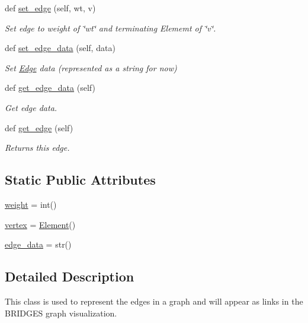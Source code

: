 \begin{DoxyCompactItemize}
def \mbox{\hyperlink{class_bridges_1_1_edge_1_1_edge_aba4ff033130d2e7efcc85360631458e8}{set\+\_\+edge}} (self, wt, v)
\begin{DoxyCompactList}\small\item\em Set edge to weight of \char`\"{}wt\char`\"{} and terminating Elememt of \char`\"{}v\char`\"{}. \end{DoxyCompactList}\item 
def \mbox{\hyperlink{class_bridges_1_1_edge_1_1_edge_a2ff2270572ae079d1db9e03c54c27056}{set\+\_\+edge\+\_\+data}} (self, data)
\begin{DoxyCompactList}\small\item\em Set \mbox{\hyperlink{class_bridges_1_1_edge_1_1_edge}{Edge}} data (represented as a string for now) \end{DoxyCompactList}\item 
def \mbox{\hyperlink{class_bridges_1_1_edge_1_1_edge_a5820f67d43e270bae8295683cf1d548f}{get\+\_\+edge\+\_\+data}} (self)
\begin{DoxyCompactList}\small\item\em Get edge data. \end{DoxyCompactList}\item 
def \mbox{\hyperlink{class_bridges_1_1_edge_1_1_edge_a96ac5e5acb598afb3d417627deb120fc}{get\+\_\+edge}} (self)
\begin{DoxyCompactList}\small\item\em Returns this edge. \end{DoxyCompactList}\end{DoxyCompactItemize}
\subsection*{Static Public Attributes}
\begin{DoxyCompactItemize}
\item 
\mbox{\hyperlink{class_bridges_1_1_edge_1_1_edge_a7219034dae365e8898fbf4bd901285b4}{weight}} = int()
\item 
\mbox{\hyperlink{class_bridges_1_1_edge_1_1_edge_aa503f86b141009ca9125093b4e903e38}{vertex}} = \mbox{\hyperlink{class_bridges_1_1_element_1_1_element}{Element}}()
\item 
\mbox{\hyperlink{class_bridges_1_1_edge_1_1_edge_ae97632efc0ced1c9530eab779d910d79}{edge\+\_\+data}} = str()
\end{DoxyCompactItemize}


\subsection{Detailed Description}
This class is used to represent the edges in a graph and will appear as links in the B\+R\+I\+D\+G\+ES graph visualization. 

